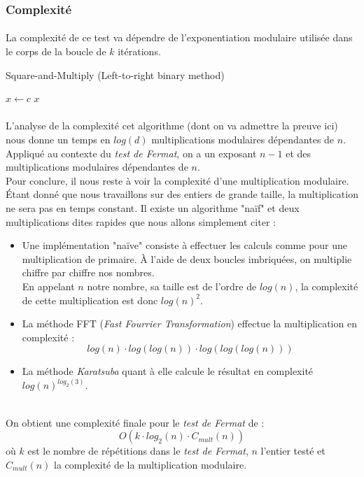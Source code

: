 		
	\subsubsection{Complexité}
		\paragraph{}La complexité de ce test va dépendre de l'exponentiation modulaire utilisée dans le corps de la boucle de $k$ itérations.\\
		
		\begin{algorithm}[H]
			\caption{Square-and-Multiply (Left-to-right binary method)}\label{SqM}
			$x \gets c$\;
		\Retour $x$\;
		\end{algorithm}
		
		\paragraph{}L'analyse de la complexité cet algorithme (dont on va admettre la preuve ici) nous donne un temps en $log(d)$ multiplications modulaires dépendantes de $n$.\\
		\indent Appliqué au contexte du \textit{test de Fermat}, on a un exposant $n-1$ et des multiplications modulaires dépendantes de $n$.\\
		\indent Pour conclure, il nous reste à voir la complexité d'une multiplication modulaire. Étant donné que nous travaillons sur des entiers de grande taille, la multiplication ne sera pas en temps constant. Il existe un algorithme "naïf" et deux multiplications dites rapides que nous allons simplement citer :
			\begin{itemize}
			\item
			Une implémentation "naïve" consiste à effectuer les calculs comme pour une multiplication de primaire. À l'aide de deux boucles imbriquées, on multiplie chiffre par chiffre nos nombres.\\
			En appelant $n$ notre nombre, sa taille est de l'ordre de $log(n)$, la complexité de cette multiplication est donc $log(n)^{2}$.
			\item
			La méthode FFT (\textit{Fast Fourrier Transformation}) effectue la multiplication en complexité :
			$$log(n) \cdot log(log(n)) \cdot log(log(log(n)))$$
			\item
			La méthode \textit{Karatsuba} quant à elle calcule le résultat en complexité $log(n)^{log_{2}(3)}$.
			\end{itemize}~\\
		On obtient une complexité finale pour le \textit{test de Fermat} de :
		\[O(k \cdot log_{2}(n) \cdot C_{mult}(n))\]
		où $k$ est le nombre de répétitions dans le \textit{test de Fermat}, $n$ l'entier testé et $C_{mult}(n)$ la complexité de la multiplication modulaire.
	
